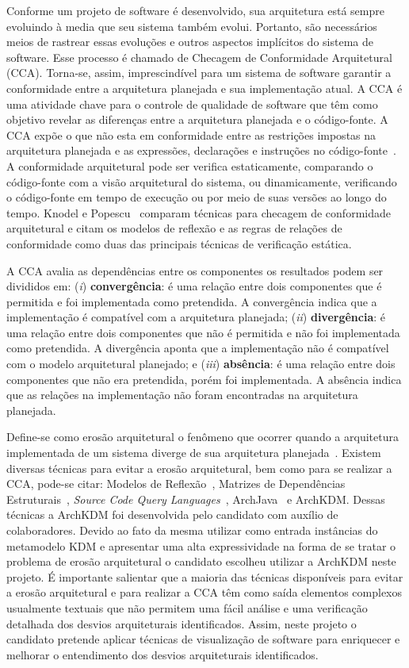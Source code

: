 \documentclass[12pt]{article}
\begin{document}
Conforme um projeto de software é desenvolvido, sua arquitetura está sempre evoluindo à media que seu sistema também evolui. Portanto, são necessários meios de rastrear essas evoluções e outros aspectos implícitos do sistema de software. Esse processo é chamado  de Checagem de Conformidade Arquitetural (CCA). Torna-se, assim, imprescindível para um sistema de software garantir a conformidade entre a arquitetura planejada e sua implementação atual. A CCA é uma atividade chave para o controle de qualidade de software que têm como objetivo revelar as diferenças entre a arquitetura planejada e o código-fonte. A CCA expõe o que não esta em conformidade entre as restrições impostas na arquitetura planejada e as expressões, declarações e instruções no código-fonte~\cite{Knodel_2007}. A conformidade arquitetural pode ser verifica estaticamente, comparando o código-fonte com a visão arquitetural do sistema, ou dinamicamente, verificando o código-fonte em tempo de execução ou por meio de suas versões ao longo do tempo. Knodel e Popescu~\cite{Knodel_2007} comparam técnicas para checagem de conformidade arquitetural e citam os modelos de reflexão e as regras de relações de conformidade como duas das principais técnicas de verificação estática. 

A CCA avalia as dependências entre os componentes os resultados podem ser divididos em: (\textit{i}) \textbf{convergência}: é uma relação entre dois componentes que é permitida e foi implementada como pretendida. A convergência indica que a implementação é compatível com a arquitetura planejada; (\textit{ii}) \textbf{divergência}: é uma relação entre dois componentes que não é permitida e não foi implementada como pretendida. A divergência aponta que a implementação não é compatível com o modelo arquitetural planejado; e (\textit{iii}) \textbf{absência}: é uma relação entre dois componentes que não era pretendida, porém foi implementada. A absência indica que as relações na implementação não foram encontradas na arquitetura planejada.


Define-se como erosão arquitetural o fenômeno que ocorrer quando a arquitetura implementada de um sistema diverge de sua arquitetura planejada~\cite{Silva2012}. Existem diversas técnicas para evitar a erosão arquitetural, bem como para se realizar a CCA, pode-se citar: Modelos de Reflexão~\cite{Murphy_1995}, Matrizes de Dependências Estruturais~\cite{Sangal_2005}, \textit{Source Code Query Languages}~\cite{Verbaere_2008}, ArchJava~\cite{ArchJava_2202} e ArchKDM. Dessas técnicas a  ArchKDM foi desenvolvida pelo candidato com auxílio de colaboradores. Devido ao fato da mesma utilizar como entrada instâncias do metamodelo KDM e apresentar uma alta expressividade na forma de se tratar o problema de erosão arquitetural o candidato escolheu utilizar a ArchKDM neste projeto. É importante salientar que a maioria das técnicas disponíveis para evitar a erosão arquitetural e para realizar a CCA têm como saída elementos complexos usualmente textuais que não permitem uma fácil análise e uma verificação detalhada dos desvios arquiteturais identificados. Assim, neste projeto o candidato pretende aplicar técnicas de visualização de software para enriquecer e melhorar o entendimento dos desvios arquiteturais identificados.  
\end{document}
